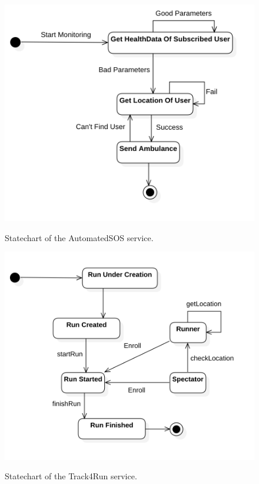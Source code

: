 \documentclass[12pt]{article}
\begin{document}
\begin{figure}[H]
\centering
\includegraphics[scale=0.3]{Activity_SOS.png}
\label{fig:Activity_SOS}
\caption{Statechart of the AutomatedSOS service.}
\end{figure}

\begin{figure}[H]
\centering
\includegraphics[scale=0.3]{Activity_T4R.png}
\label{fig:Activity_T4R}
\caption{Statechart of the Track4Run service.}
\end{figure}
\end{document}
